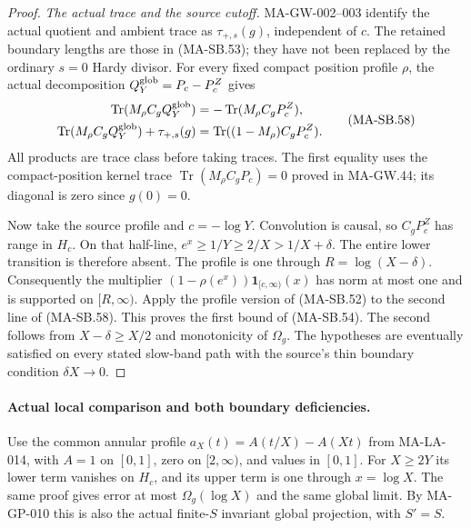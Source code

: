 \begin{proof}
\emph{The actual trace and the source cutoff.}
MA-GW-002--003 identify the actual quotient and
ambient trace as $\tau_{+,s}(g)$, independent of
$c$.  The retained boundary lengths are those
in (MA-SB.53); they have not been replaced by
the ordinary $s=0$ Hardy divisor.
For every fixed compact position profile $\rho$,
the actual decomposition
$Q_Y^{\rm glob}=P_c-P_c^Z$ gives
\[
 \begin{aligned}
 \operatorname{Tr}(M_\rho C_gQ_Y^{\rm glob})
      &=-\operatorname{Tr}(M_\rho C_gP_c^Z),\\
 \operatorname{Tr}(M_\rho C_gQ_Y^{\rm glob})
                       +\tau_{+,s}(g)
      &=\operatorname{Tr}((1-M_\rho)C_gP_c^Z).
 \end{aligned}
 \tag{MA-SB.58}
\]
All products are trace class before taking traces.
The first equality uses the compact-position
kernel trace $\operatorname{Tr}(M_\rho C_gP_c)=0$
proved in MA-GW.44; its diagonal is zero since
$g(0)=0$.

Now take the source profile and $c=-\log Y$.
Convolution is causal, so $C_gP_c^Z$ has range
in $H_c$.  On that half-line,
$e^x\ge1/Y\ge2/X>1/X+\delta$.
The entire lower transition is therefore absent.
The profile is one through
$R=\log(X-\delta)$.
Consequently the multiplier
$(1-\rho(e^x))\mathbf1_{[c,\infty)}(x)$ has norm
at most one and is supported on $[R,\infty)$.
Apply the profile version of (MA-SB.52) to the
second line of (MA-SB.58).  This proves the first
bound of (MA-SB.54).  The second follows from
$X-\delta\ge X/2$ and monotonicity of $\Omega_g$.
The hypotheses are eventually satisfied on every
stated slow-band path with the source's thin
boundary condition $\delta X\to0$.
\end{proof}

\paragraph{Actual local comparison and both boundary deficiencies.}
Use the common annular profile
$a_X(t)=A(t/X)-A(Xt)$ from MA-LA-014,
with $A=1$ on $[0,1]$, zero on $[2,\infty)$,
and values in $[0,1]$.
For $X\ge2Y$ its lower term vanishes on $H_c$,
and its upper term is one through $x=\log X$.
The same proof gives error at most
$\Omega_g(\log X)$ and the same global limit.
By MA-GP-010 this is also the actual finite-$S$
invariant global projection, with $S'=S$.


